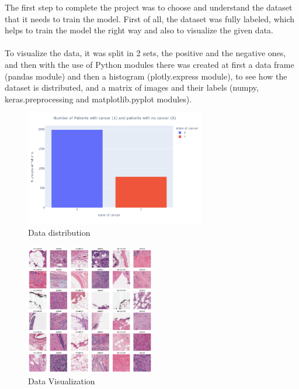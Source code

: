 The first step to complete the project was to choose and understand the dataset that it needs to train the model. First of all, the dataset was fully labeled, which helps to train the model the right way and also to visualize the given data. \\~\\
To visualize the data, it was split in 2 sets, the positive and the negative ones, and then with the use of Python modules there was created at first a data frame (pandas module) and then a histogram (plotly.express module), to see how the dataset is distributed, and a matrix of images and their labels (numpy, keras.preprocessing and matplotlib.pyplot modules).
\begin{figure}[H]
    \centering
    \includegraphics[width=0.7\textwidth]{Images/Histogram.png}
    \caption{Data distribution}
    \label{fig:Figure1}
\end{figure}
\begin{figure}[H]
    \centering
    \includegraphics[width=0.5\textwidth]{Images/DataVisualization.png}
    \caption{Data Visualization}
    \label{fig:example}
\end{figure}
